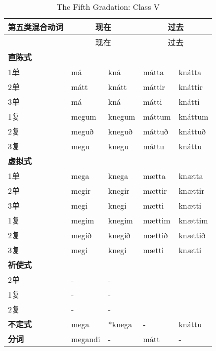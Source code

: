\begin{longtable}{lllll}
  \caption[The Fifth Gradation: Class V]{The Fifth Gradation: Class
    V}\tabularnewline
  \toprule
  第五类混合动词  & \multicolumn{2}{c}{现在} & \multicolumn{2}{c}{过去}                    \\\midrule\endfirsthead{} &\multicolumn{2}{c}{现在} &\multicolumn{2}{c}{过去} \\
  \midrule
  \endhead
  \bottomrule
  \endfoot
  \textbf{直陈式} & ~                        & ~                        & ~      & ~       \\
  1单             & má                       & kná                      & mátta  & knátta  \\
  2单             & mátt                     & knátt                    & máttir & knáttir \\
  3单             & má                       & kná                      & mátti  & knátti  \\
  1复             & megum                    & knegum                   & máttum & knáttum \\
  2复             & meguð                    & kneguð                   & máttuð & knáttuð \\
  3复             & megu                     & knegu                    & máttu  & knáttu  \\
  \textbf{虚拟式} & ~                        & ~                        & ~      & ~       \\
  1单             & mega                     & knega                    & mætta  & knætta  \\
  2单             & megir                    & knegir                   & mættir & knættir \\
  3单             & megi                     & knegi                    & mætti  & knætti  \\
  1复             & megim                    & knegim                   & mættim & knættim \\
  2复             & megið                    & knegið                   & mættið & knættið \\
  3复             & megi                     & knegi                    & mætti  & knætti  \\
  \textbf{祈使式} & ~                        & ~                        & ~      & ~       \\
  2单             & -                        & -                        & ~      & ~       \\
  1复             & -                        & -                        & ~      & ~       \\
  2复             & -                        & -                        & ~      & ~       \\
  \textbf{不定式} & mega                     & *knega                   & -      & knáttu  \\
  \textbf{分词}   & megandi                  & -                        & mátt   & -       \\
\end{longtable}

